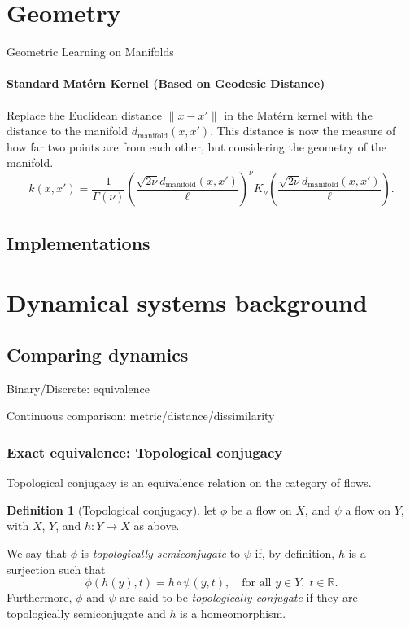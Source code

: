 \documentclass{article}
\theoremstyle{definition} \newtheorem{definition}{Definition}  \newtheorem{example}{Example}
\theoremstyle{remark} \newtheorem{remark}{Remark}
\newcounter{ct}
\begin{document}
\newpage
\section{Geometry}
Geometric Learning on Manifolds\citep{mostowsky2024geometrickernels}


\paragraph{Standard Matérn Kernel (Based on Geodesic Distance)}
Replace the Euclidean distance  $\| x - x' \|$  in the Matérn kernel with the distance to the manifold  $ d_{\text{manifold}}(x, x')$. 
This distance is now the measure of how far two points are from each other, but considering the geometry of the manifold.
\begin{equation}
k(x, x') = \frac{1}{\Gamma(\nu)} \left( \frac{\sqrt{2\nu} d_{\text{manifold}}(x, x')}{\ell} \right)^\nu K_\nu\left( \frac{\sqrt{2\nu} d_{\text{manifold}}(x, x')}{\ell} \right).
\end{equation}


\subsection{Implementations}
\citep{miolane2020geomstats}







\newpage
\section{Dynamical systems background}

\subsection{Comparing dynamics}
Binary/Discrete: equivalence

Continuous comparison: metric/distance/dissimilarity



\subsubsection{Exact equivalence: Topological conjugacy}\label{sec:top_conj}

Topological conjugacy is an equivalence relation on the category of flows. %
\begin{definition}[Topological conjugacy]\label{def:top_conj}
let $\phi$ be a flow on $X$, and $\psi$ a flow on $Y$, with $X$, $Y$, and $h\colon Y \to X$ as above.

We say that $\phi$ is \emph{topologically semiconjugate} to $\psi$ if, by definition, $h$ is a surjection such that
\[
\phi(h(y), t) = h \circ \psi(y, t), \quad \text{for all } y \in Y, \; t \in \mathbb{R}.
\]
Furthermore, $\phi$ and $\psi$ are said to be \emph{topologically conjugate} if they are topologically semiconjugate and $h$ is a homeomorphism.
\end{definition}
\end{document}
